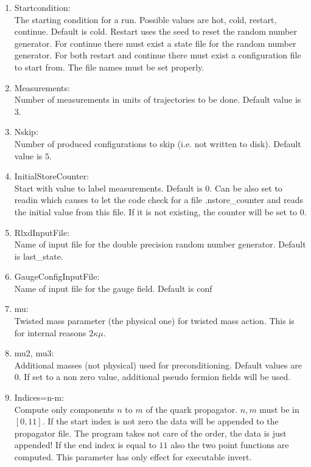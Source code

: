 \begin{enumerate}
\item {\ttfamily Startcondition}:\\
  The starting condition for a run. Possible values are {\ttfamily
    hot, cold, restart, continue}. Default is {\ttfamily
    cold}. Restart uses the seed to reset the random number
  generator. For continue there must exist a state file for the random
  number generator. For both restart and continue there must exist a
  configuration file to start from. The file names must be set properly.

\item {\ttfamily Measurements}:\\
  Number of measurements in units of trajectories to be done. Default
  value is $3$. 

\item {\ttfamily Nskip}:\\
  Number of produced configurations to skip (i.e. not written to
  disk). Default value is $5$. 

\item {\ttfamily InitialStoreCounter}:\\
  Start with value to label measurements. Default is $0$. Can be also
  set to {\ttfamily readin} which causes to let the code check for a
  file {\ttfamily .nstore\_counter} and reads the initial value from
  this file. If it is not existing, the counter will be set to $0$.

\item {\ttfamily RlxdInputFile}:\\
  Name of input file for the double precision random number
  generator. Default is {\ttfamily last\_state}.

\item {\ttfamily GaugeConfigInputFile}:\\
  Name of input file for the gauge field. Default is {\ttfamily conf}

\item {\ttfamily mu}:\\
  Twisted mass parameter (the physical one) for twisted mass
  action. This is for internal reasons $2\kappa\mu$.

\item {\ttfamily mu2, mu3}:\\
  Additional masses (not physical) used for preconditioning. Default values are
  $0$. If set to a non zero value, additional pseudo fermion fields
  will be used.

\item {\ttfamily Indices=n-m}:\\
  Compute only components $n$ to $m$ of the quark propagator. $n,m$ must
  be in $[0,11]$. If the start index is not zero the data will be
  appended to the propagator file. The program takes not care of the
  order, the data is just appended! If the end index is equal to $11$
  also the two point functions are computed. This parameter has only
  effect for executable {\ttfamily invert}.


\end{enumerate}
